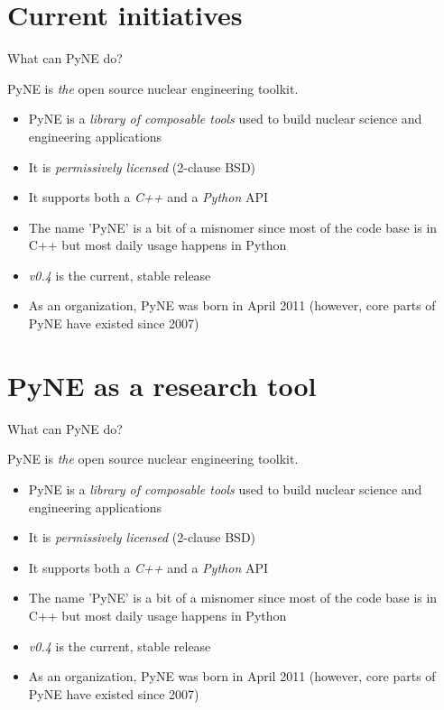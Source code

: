 \documentclass[xcolor=x11names,compress]{beamer}
\renewcommand{\(}{\begin{columns}}
\renewcommand{\)}{\end{columns}}
\newcommand{\<}[1]{\begin{column}{#1}}
\renewcommand{\>}{\end{column}}
\begin{document}
\section{Current initiatives}
\begin{frame}{What can PyNE do?}

    PyNE is \textit{the} open source nuclear engineering toolkit.
    \vspace*{1em}
    \begin{itemize}
    \item PyNE is a \textit{library of composable tools} used to build 
    nuclear science and engineering applications
    \item It is \textit{permissively licensed} (2-clause BSD)
    \item It supports both a \textit{C++} and a \textit{Python} API
    \item The name 'PyNE' is a bit of a misnomer since most of the code 
    base is in C++ but most daily usage happens in Python
    \item \textit{v0.4} is the current, stable release
    \item As an organization, PyNE was born in April 2011 
    (however, core parts of PyNE have existed since 2007)
    \end{itemize}

\end{frame}

\section{PyNE as a research tool}
\begin{frame}{What can PyNE do?}

    PyNE is \textit{the} open source nuclear engineering toolkit.
    \vspace*{1em}
    \begin{itemize}
    \item PyNE is a \textit{library of composable tools} used to build 
    nuclear science and engineering applications
    \item It is \textit{permissively licensed} (2-clause BSD)
    \item It supports both a \textit{C++} and a \textit{Python} API
    \item The name 'PyNE' is a bit of a misnomer since most of the code 
    base is in C++ but most daily usage happens in Python
    \item \textit{v0.4} is the current, stable release
    \item As an organization, PyNE was born in April 2011 
    (however, core parts of PyNE have existed since 2007)
    \end{itemize}

\end{frame}
\end{document}
